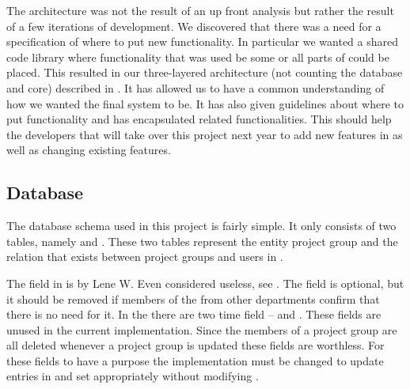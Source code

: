The architecture was not the result of an up front analysis but rather the result of a few iterations of development.
We discovered that there was a need for a specification of where to put new functionality.
In particular we wanted a shared code library where functionality that was used be some or all parts of \system{} could be placed.
This resulted in our three-layered architecture (not counting the database and \moodle{} core) described in .
It has allowed us to have a common understanding of how we wanted the final system to be.
It has also given guidelines about where to put functionality and has encapsulated related functionalities.
This should help the developers that will take over this project next year to add new features in as well as changing existing features.



\subsection{Database}
The database schema used in this project is fairly simple.
It only consists of two tables, namely   and . 
These two tables represent the entity project group and the relation that exists between project groups and users in \moodle{}. 

The  field in  is by Lene W. Even considered useless, see . 
The field is optional, but it should be removed if members of the \admpers{} from other departments confirm that there is no need for it. 
In the  there are two time field --  and . 
These fields are unused in the current implementation. 
Since the members of a project group are all deleted whenever a project group is updated these fields are worthless.
For these fields to have a purpose the implementation must be changed to update entries in  and set  appropriately without modifying .


